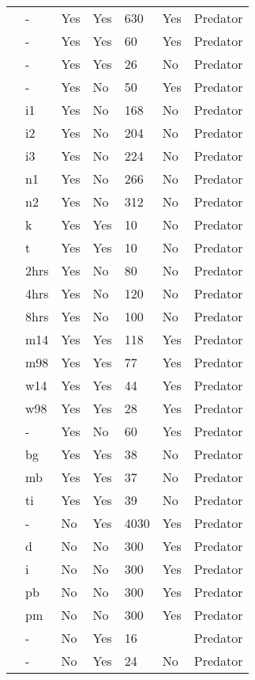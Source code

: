 \begin{table}[!tbp]
\begin{center}
\begin{tabular}{lllllll}
\citet{Prokopenko:2017aa}&-&Yes&Yes&630&Yes&Predator\tabularnewline
\citet{Pusack:2018aa}&-&Yes&Yes&60&Yes&Predator\tabularnewline
\citet{Reeve:1997aa}&-&Yes&Yes&26&No&Predator\tabularnewline
\citet{Salt:1974aa}&-&Yes&No&50&Yes&Predator\tabularnewline
\citet{Uttley:1980aa}&i1&Yes&No&168&No&Predator\tabularnewline
\citet{Uttley:1980aa}&i2&Yes&No&204&No&Predator\tabularnewline
\citet{Uttley:1980aa}&i3&Yes&No&224&No&Predator\tabularnewline
\citet{Uttley:1980aa}&n1&Yes&No&266&No&Predator\tabularnewline
\citet{Uttley:1980aa}&n2&Yes&No&312&No&Predator\tabularnewline
\citet{Vahl:2005aa}&k&Yes&Yes&10&No&Predator\tabularnewline
\citet{Vahl:2005aa}&t&Yes&Yes&10&No&Predator\tabularnewline
\citet{Von-Westernhagen:1976aa}&2hrs&Yes&No&80&No&Predator\tabularnewline
\citet{Von-Westernhagen:1976aa}&4hrs&Yes&No&120&No&Predator\tabularnewline
\citet{Von-Westernhagen:1976aa}&8hrs&Yes&No&100&No&Predator\tabularnewline
\citet{Vucetich:2002aa}&m14&Yes&Yes&118&Yes&Predator\tabularnewline
\citet{Vucetich:2002aa}&m98&Yes&Yes&77&Yes&Predator\tabularnewline
\citet{Vucetich:2002aa}&w14&Yes&Yes&44&Yes&Predator\tabularnewline
\citet{Vucetich:2002aa}&w98&Yes&Yes&28&Yes&Predator\tabularnewline
\citet{Walde:1984aa}&-&Yes&No&60&Yes&Predator\tabularnewline
\citet{Wasserman:2016aa}&bg&Yes&Yes&38&No&Predator\tabularnewline
\citet{Wasserman:2016aa}&mb&Yes&Yes&37&No&Predator\tabularnewline
\citet{Wasserman:2016aa}&ti&Yes&Yes&39&No&Predator\tabularnewline
\citet{Cresswell:1998aa}&-&No&Yes&4030&Yes&Predator\tabularnewline
\citet{Elliott:2003aa}&d&No&No&300&Yes&Predator\tabularnewline
\citet{Elliott:2003aa}&i&No&No&300&Yes&Predator\tabularnewline
\citet{Elliott:2003aa}&pb&No&No&300&Yes&Predator\tabularnewline
\citet{Elliott:2003aa}&pm&No&No&300&Yes&Predator\tabularnewline
\citet{Hebblewhite:2013aa}&-&No&Yes&16&&Predator\tabularnewline
\citet{Stier:2013aa}&-&No&Yes&24&No&Predator\tabularnewline
\hline
\end{tabular}\end{center}
\end{table}
